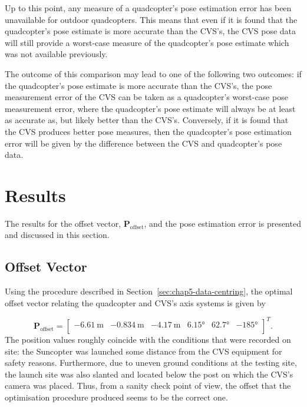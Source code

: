 Up to this point, any measure of a quadcopter's pose estimation error has been unavailable for outdoor quadcopters. This means that even if it is found that the quadcopter's pose estimate is more accurate than the CVS's, the CVS pose data will still provide a worst-case measure of the quadcopter's pose estimate which was not available previously. 

The outcome of this comparison may lead to one of the following two outcomes: if the quadcopter's pose estimate is more accurate than the CVS's, the pose measurement error of the CVS can be taken as a quadcopter's worst-case pose measurement error, where the quadcopter's pose estimate will always be at least as accurate as, but likely better than the CVS's. Conversely, if it is found that the CVS produces better pose measures, then the quadcopter's pose estimation error will be given by the difference between the CVS and quadcopter's pose data. 

\section{Results}

The results for the offset vector, $\bm{P}_{\mathrm{offset}}$, and the pose estimation error is presented and discussed in this section. 

\subsection{Offset Vector}

Using the procedure described in Section~\ref{sec:chap5-data-centring}, the optimal offset vector relating the quadcopter and CVS's axis systems is given by 

\begin{equation}
  \label{eq:chap5-offset-result}
  \bm{P}_{\mathrm{offset}} = 
  \begin{bmatrix}
    \SI{-6.61}{\m} & \SI{-0.834}{\m} & \SI{-4.17}{\m} & \ang{6.15} & \ang{62.7} & \ang{-185} \\
  \end{bmatrix}^T.
\end{equation}
The position values roughly coincide with the conditions that were recorded on site: the Suncopter was launched some distance from the CVS equipment for safety reasons. Furthermore, due to uneven ground conditions at the testing site, the launch site was also slanted and located below the post on which the CVS's camera was placed. Thus, from a sanity check point of view, the offset that the optimisation procedure produced seems to be the correct one. 

